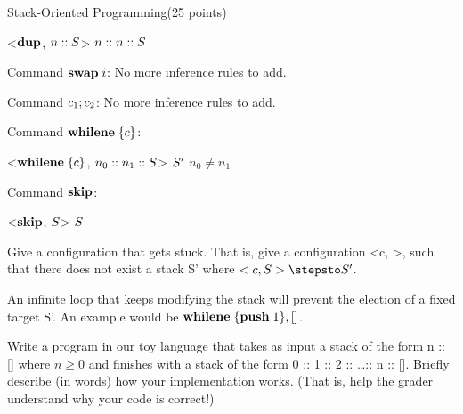 \documentclass{article}
\begin{document}
\begin{question}{Stack-Oriented Programming}{(25 points)}
\begin{subquestion}
\begin{subsubquestion}
      \infrule[DUP]
      {
      	
      }
      {
      	<$\mathbf{dup}$, $n :: S$> \stepsto $n :: n :: S$
      }
      {
      }
    \end{subsubquestion}
    \begin{subsubquestion}
      Command $\mathbf{swap}\;{i}$: No more inference rules to add.
    \end{subsubquestion}
    \begin{subsubquestion}
      Command $c_1; c_2$: No more inference rules to add.
    \end{subsubquestion}
    \begin{subsubquestion}
      Command $\mathbf{whilene}\;\{c\}$: 
      
      {
      	<$\mathbf{whilene}\;\{c\}$, $n_0 :: n_1 :: S$> \stepsto $S'$
      }
      {
      	$n_0 \ne n_1$
      }
      
    \end{subsubquestion}
    \begin{subsubquestion}
      Command $\mathbf{skip}$: 
      
      \infrule[SKIP]
      {
      	
      }
      {
      	<$\mathbf{skip}$, $S$> \stepsto $S$
      }
      {
      }
    \end{subsubquestion}

  \end{subquestion}

  \begin{subquestion}
     Give a configuration that gets stuck. That is, give a configuration <c, \stack>, such that there does not exist a stack S' where $<c, S> \stepsto S'$.
     
     An infinite loop that keeps modifying the stack will prevent the election of a fixed target S'. An example would be $\mathbf{whilene}\;\{\mathbf{push}\;1\}, []$.
    
  \end{subquestion}
  
  \begin{subquestion}
 Write a program in our toy language that takes as input a stack of the form n :: [] where $n \geq 0$ and
finishes with a stack of the form 0 :: 1 :: 2 :: \dots :: n :: []. Briefly describe (in words) how your
implementation works. (That is, help the grader understand why your code is correct!)


\end{subquestion}
\end{question}
\end{document}
